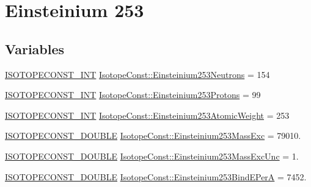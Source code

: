 \hypertarget{group___isotope_const-_einsteinium-_es253}{}\section{Einsteinium 253}
\label{group___isotope_const-_einsteinium-_es253}
\subsection*{Variables}
\begin{DoxyCompactItemize}
\item 
\mbox{\hyperlink{group___isotope_const-_macros_ga5f18360b3e99483a35c32d789e62621c}{I\+S\+O\+T\+O\+P\+E\+C\+O\+N\+S\+T\+\_\+\+I\+NT}} \mbox{\hyperlink{group___isotope_const-_einsteinium-_es253_ga05a315db43603a530539442b884837fe}{Isotope\+Const\+::\+Einsteinium253\+Neutrons}} = 154
\item 
\mbox{\hyperlink{group___isotope_const-_macros_ga5f18360b3e99483a35c32d789e62621c}{I\+S\+O\+T\+O\+P\+E\+C\+O\+N\+S\+T\+\_\+\+I\+NT}} \mbox{\hyperlink{group___isotope_const-_einsteinium-_es253_ga34cfa2226473631cd3d76ea0cd24fb3c}{Isotope\+Const\+::\+Einsteinium253\+Protons}} = 99
\item 
\mbox{\hyperlink{group___isotope_const-_macros_ga5f18360b3e99483a35c32d789e62621c}{I\+S\+O\+T\+O\+P\+E\+C\+O\+N\+S\+T\+\_\+\+I\+NT}} \mbox{\hyperlink{group___isotope_const-_einsteinium-_es253_ga9b8d2456b139ffabb3b623b4fcdd83bc}{Isotope\+Const\+::\+Einsteinium253\+Atomic\+Weight}} = 253
\item 
\mbox{\hyperlink{group___isotope_const-_macros_ga8f45a7272ce02c0b4c65c44636ed719a}{I\+S\+O\+T\+O\+P\+E\+C\+O\+N\+S\+T\+\_\+\+D\+O\+U\+B\+LE}} \mbox{\hyperlink{group___isotope_const-_einsteinium-_es253_ga4164925df84fd8d70b261dd6a91cbf53}{Isotope\+Const\+::\+Einsteinium253\+Mass\+Exc}} = 79010.
\item 
\mbox{\hyperlink{group___isotope_const-_macros_ga8f45a7272ce02c0b4c65c44636ed719a}{I\+S\+O\+T\+O\+P\+E\+C\+O\+N\+S\+T\+\_\+\+D\+O\+U\+B\+LE}} \mbox{\hyperlink{group___isotope_const-_einsteinium-_es253_ga7b1b18419731a43affb1e9a229975216}{Isotope\+Const\+::\+Einsteinium253\+Mass\+Exc\+Unc}} = 1.
\item 
\mbox{\hyperlink{group___isotope_const-_macros_ga8f45a7272ce02c0b4c65c44636ed719a}{I\+S\+O\+T\+O\+P\+E\+C\+O\+N\+S\+T\+\_\+\+D\+O\+U\+B\+LE}} \mbox{\hyperlink{group___isotope_const-_einsteinium-_es253_gad83a1e32aa43e70a5a6603dd4252300c}{Isotope\+Const\+::\+Einsteinium253\+Bind\+E\+PerA}} = 7452.

\end{DoxyCompactItemize}
